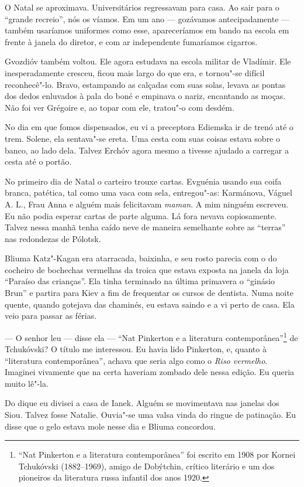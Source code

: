O Natal se aproximava. Universitários regressavam para casa. Ao sair
para o ``grande recreio'', nós os víamos. Em um ano --- gozávamos
antecipadamente --- também usaríamos uniformes como esse, apareceríamos
em bando na escola em frente à janela do diretor, e com ar independente
fumaríamos cigarros.

Gvozdióv também voltou. Ele agora estudava na escola militar de
Vladímir. Ele inesperadamente cresceu, ficou mais largo do que era, e
tornou"-se difícil reconhecê"-lo. Bravo, estampando as calçadas com suas
solas, levava as pontas dos dedos enluvados à pala do boné e empinava o
nariz, encantando as moças. Não foi ver Grégoire e, ao topar com ele,
tratou"-o com desdém.

No dia em que fomos dispensados, eu vi a preceptora Ediemska ir de trenó
até o trem. Solene, ela sentava"-se ereta. Uma cesta com suas coisas
estava sobre o banco, ao lado dela. Talvez Erchóv agora mesmo a tivesse
ajudado a carregar a cesta até o portão.

No primeiro dia de Natal o carteiro trouxe cartas. Evguénia usando sua
coifa branca, patética, tal como uma vaca com sela, entregou"-as:
Karmánova, Váguel A. L., Frau Anna e alguém mais felicitavam
\emph{maman}. A mim ninguém escreveu. Eu não podia esperar cartas de
parte alguma. Lá fora nevava copiosamente. Talvez nessa manhã tenha
caído neve de maneira semelhante sobre as ``terras'' nas redondezas de
Pólotsk.

Bliuma Katz"-Kagan era atarracada, baixinha, e seu rosto parecia com o do
cocheiro de bochechas vermelhas da troica que estava exposta na janela
da loja ``Paraíso das crianças''. Ela tinha terminado na última
primavera o ``ginásio Brun'' e partira para Kiev a fim de frequentar os
cursos de dentista. Numa noite quente, quando gotejava das chaminés, eu
estava saindo e a vi perto de casa. Ela veio para passar as férias.

--- O senhor leu --- disse ela --- ``Nat Pinkerton e a literatura
contemporânea''\footnote{``Nat Pinkerton e a literatura contemporânea''
  foi escrito em 1908 por Kornei Tchukóvski (1882--1969), amigo de
  Dobýtchin, crítico literário e um dos pioneiros da literatura russa
  infantil dos anos 1920.} de Tchukóvski? O título me interessou. Eu
havia lido Pinkerton, e, quanto à ``literatura contemporânea'', achava
que seria algo como o \emph{Riso vermelho}. Imaginei vivamente que na
certa haveriam zombado dele nessa edição. Eu queria muito lê"-la.

Do dique eu divisei a casa de Ianek. Alguém se movimentava nas janelas
dos Siou. Talvez fosse Natalie. Ouvia"-se uma valsa vinda do ringue de
patinação. Eu disse que o gelo estava mole nesse dia e Bliuma concordou.

